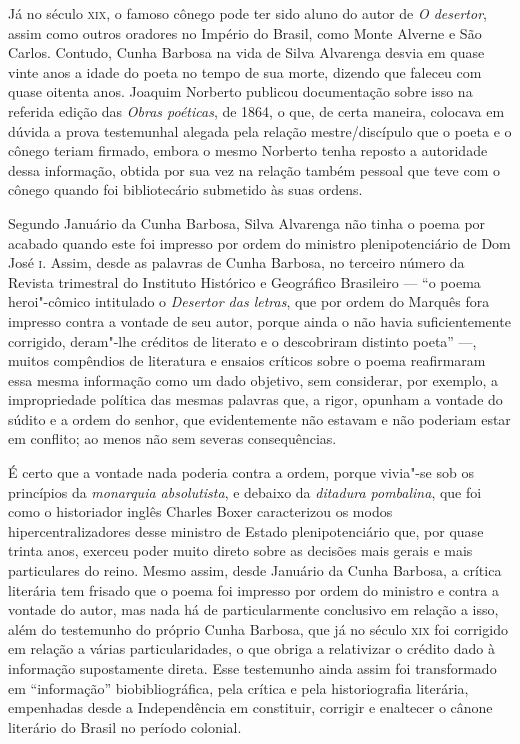 Já no século \textsc{xix}, o famoso cônego pode ter sido aluno do autor de \textit{O
desertor}, assim como outros oradores no Império do Brasil, como Monte Alverne e
São Carlos. Contudo, Cunha Barbosa na vida de Silva Alvarenga desvia em quase
vinte anos a idade do poeta no tempo de sua morte, dizendo que faleceu com quase
oitenta anos. Joaquim Norberto publicou documentação sobre isso na referida
edição das \textit{Obras poéticas}, de 1864, o que, de certa maneira, colocava
em dúvida a prova testemunhal alegada pela relação mestre/discípulo que o poeta
e o cônego teriam firmado, embora o mesmo Norberto tenha reposto a autoridade
dessa informação, obtida por sua vez na relação também pessoal que teve com o
cônego quando foi bibliotecário submetido às suas ordens.

Segundo Januário da Cunha Barbosa, Silva Alvarenga não tinha o poema por acabado
quando este foi impresso por ordem do ministro plenipotenciário de Dom José
\textsc{i}. Assim, desde as palavras de Cunha Barbosa, no terceiro número da
Revista trimestral do Instituto Histórico e Geográfico Brasileiro --- ``o poema
heroi"-cômico intitulado o \textit{Desertor das letras}, que por ordem do Marquês
fora impresso contra a vontade de seu autor, porque ainda o não havia
suficientemente corrigido, deram"-lhe créditos de literato e o descobriram
distinto poeta'' ---, muitos compêndios de literatura e ensaios críticos sobre o
poema reafirmaram essa mesma informação como um dado objetivo, sem considerar,
por exemplo, a impropriedade política das mesmas palavras que, a rigor, opunham
a vontade do súdito e a ordem do senhor, que evidentemente não estavam e não
poderiam estar em conflito; ao menos não sem severas consequências.

É certo que a vontade nada poderia contra a ordem, porque vivia"-se sob os
princípios da \textit{monarquia absolutista}, e debaixo da \textit{ditadura
pombalina}, que foi como o historiador inglês Charles Boxer caracterizou os
modos hipercentralizadores desse ministro de Estado plenipotenciário que, por
quase trinta anos, exerceu poder muito direto sobre as decisões mais gerais e
mais particulares do reino.  Mesmo assim, desde Januário da Cunha Barbosa, a
crítica literária tem frisado que o poema foi impresso por ordem do ministro e
contra a vontade do autor, mas nada há de particularmente conclusivo em relação
a isso, além do testemunho do próprio Cunha Barbosa, que já no século
\textsc{xix} foi corrigido em relação a várias particularidades, o que obriga a
relativizar o crédito dado à informação supostamente direta.  Esse testemunho
ainda assim foi transformado em ``informação'' biobibliográfica, pela crítica e
pela historiografia literária, empenhadas desde a Independência em constituir,
corrigir e enaltecer o cânone literário do Brasil no período colonial.

